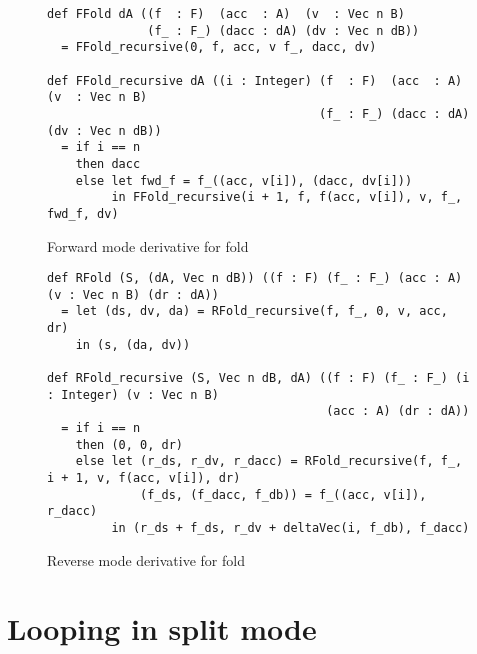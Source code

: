 \documentclass[sigplan,review]{acmart}
\begin{document}
\begin{figure*}
\begin{verbatim}
def FFold dA ((f  : F)  (acc  : A)  (v  : Vec n B)
              (f_ : F_) (dacc : dA) (dv : Vec n dB))
  = FFold_recursive(0, f, acc, v f_, dacc, dv)

def FFold_recursive dA ((i : Integer) (f  : F)  (acc  : A)  (v  : Vec n B)
                                      (f_ : F_) (dacc : dA) (dv : Vec n dB))
  = if i == n
    then dacc
    else let fwd_f = f_((acc, v[i]), (dacc, dv[i]))
         in FFold_recursive(i + 1, f, f(acc, v[i]), v, f_, fwd_f, dv)
\end{verbatim}
\caption{Forward mode derivative for fold}
\end{figure*}

\begin{figure*}
\begin{verbatim}
def RFold (S, (dA, Vec n dB)) ((f : F) (f_ : F_) (acc : A) (v : Vec n B) (dr : dA))
  = let (ds, dv, da) = RFold_recursive(f, f_, 0, v, acc, dr)
    in (s, (da, dv))

def RFold_recursive (S, Vec n dB, dA) ((f : F) (f_ : F_) (i : Integer) (v : Vec n B)
                                       (acc : A) (dr : dA))
  = if i == n
    then (0, 0, dr)
    else let (r_ds, r_dv, r_dacc) = RFold_recursive(f, f_, i + 1, v, f(acc, v[i]), dr)
             (f_ds, (f_dacc, f_db)) = f_((acc, v[i]), r_dacc)
         in (r_ds + f_ds, r_dv + deltaVec(i, f_db), f_dacc)
\end{verbatim}
\caption{Reverse mode derivative for fold}
\end{figure*}

\newcommand{\proctype}[3]{#2 \vdash #1 \dashv #3}

\section{Looping in split mode}
\end{document}
